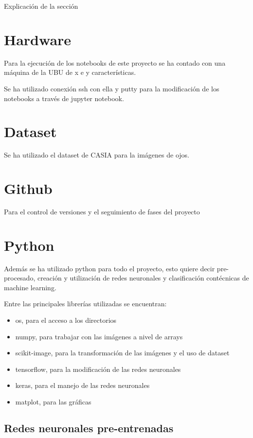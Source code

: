  \label{capitulo4}

Explicación de la sección

\section{Hardware}

Para la ejecución de los notebooks de este proyecto se ha contado con una máquina de la UBU de x e y características.

Se ha utilizado conexión ssh con ella y putty para la modificación de los notebooks a través de jupyter notebook.

\section{Dataset} 

Se ha utilizado el dataset de CASIA para la imágenes de ojos.

\section{Github}
Para el control de versiones y el seguimiento de fases del proyecto

\section{Python}

Además se ha utilizado python para todo el proyecto, esto quiere decir pre-procesado, creación y utilización de redes neuronales y clasificación contécnicas de 
machine learning.

Entre las principales librerías utilizadas se encuentran:

\begin{itemize}
    \item os, para el acceso a los directorios
    \item numpy, para trabajar con las imágenes a nivel de arrays
    \item scikit-image, para la transformación de las imágenes y el uso de dataset
    \item tensorflow, para la modificación de las redes neuronales
    \item keras, para el manejo de las redes neuronales
    \item matplot, para las gráficas
\end{itemize}

\subsection{Redes neuronales pre-entrenadas}

